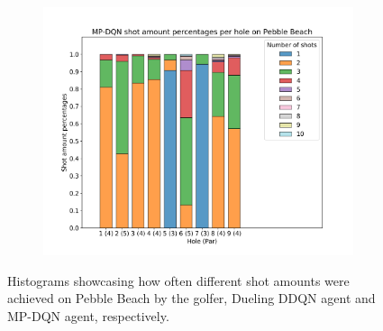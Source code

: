 \documentclass{kththesis}
\begin{document}
\begin{figure}
\begin{subfigure}{\textwidth}
    \centering
    \includegraphics[height=0.3\textheight]{AgentPercentages/MPDQN_Shot_Percentages_Pebble.png} 
    \end{subfigure}
    \caption{Histograms showcasing how often different shot amounts were achieved on Pebble Beach by the golfer, Dueling DDQN agent and MP-DQN agent, respectively.}
    \label{fig:pebble_shot_histograms}
\end{figure}
\end{document}
